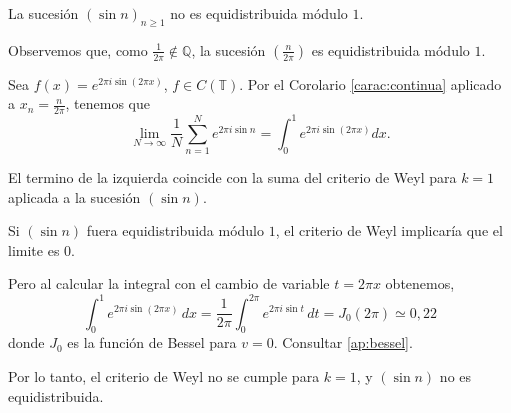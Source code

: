\begin{example}
    \label{ex:sin_noeq}
    La sucesión $(\sin n)_{n\geq1}$ no es equidistribuida módulo $1$.
\end{example} 

\begin{resolve}
    Observemos que, como $\frac{1}{2\pi}\notin \mathbb{Q}$, la sucesión 
    $(\frac{n}{2\pi})$ es equidistribuida módulo $1$.

    Sea $f(x)=e^{2\pi i \sin(2\pi x)}$, $f\in C(\mathbb{T})$.
    Por el Corolario \ref{carac:continua} aplicado a $x_n=\frac n{2\pi}$, tenemos que
    \[
        \lim_{N\to\infty} \frac{1}{N}\sum_{n=1}^N e^{2\pi i \sin n} = \int_0^1 e^{2\pi i \sin(2\pi x)} dx.
    \]

    El termino de la izquierda coincide con la suma del criterio de Weyl 
    para $k=1$ aplicada a la sucesión $(\sin n)$.

    Si $(\sin n)$ fuera equidistribuida módulo $1$, el criterio de Weyl 
    implicaría que el limite es $0$.
    
    Pero al calcular la integral con el cambio de variable $t=2\pi x$ 
    obtenemos,
    \[
        \int_0^1 e^{2\pi i \sin(2\pi x)} \,dx = 
        \frac{1}{2\pi} \int_0^{2\pi} e^{2\pi i \sin t} \,dt
        = J_0(2\pi) \simeq 0,22
    \]
    donde $J_0$ es la función de Bessel para $v=0$. Consultar \ref{ap:bessel}. 
    
    Por lo tanto, el criterio de Weyl no se cumple para $k=1$, y $(\sin n)$
    no es equidistribuida.
\end{resolve}